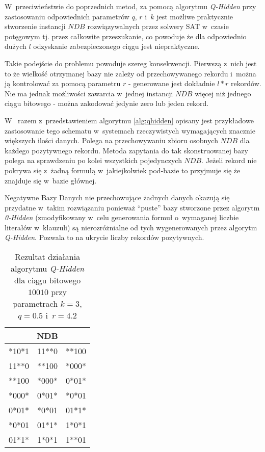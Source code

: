 W~przeciwieństwie do poprzednich metod, za pomocą algorytmu \textit{Q-Hidden} przy zastosowaniu odpowiednich
parametrów $q$, $r$ i~$k$ jest możliwe praktycznie stworzenie instancji $NDB$ rozwiązywalnych przez solwery SAT 
w~czasie potęgowym tj. przez całkowite przeszukanie, co powoduje że dla odpowiednio dużych $l$ odzyskanie 
zabezpieczonego ciągu jest niepraktyczne.

Takie podejście do problemu powoduje szereg konsekwencji. Pierwszą z~nich jest to że wielkość otrzymanej bazy
nie zależy od przechowywanego rekordu i~można ją kontrolować za pomocą parametru $r$ 
- generowane jest dokładnie $l * r$ rekordów. Nie ma jednak możliwości zawarcia w~jednej instancji $NDB$ 
więcej niż jednego ciągu bitowego - można zakodować jedynie zero lub jeden rekord.

W~\cite{HARD-NDB} razem z~przedstawieniem algorytmu \ref{alg:qhidden} opisany jest przykładowe zastosowanie tego schematu 
w~systemach rzeczywistych wymagających znacznie większych ilości danych. Polega na przechowywaniu zbioru osobnych $NDB$ 
dla każdego pozytywnego rekordu. Metoda zapytania do tak skonstruowanej bazy polega na sprawdzeniu po kolei wszystkich pojedynczych $NDB$.
Jeżeli rekord nie pokrywa się z~żadną formułą w~jakiejkolwiek pod-bazie to przyjmuje się że znajduje się w~bazie głównej.

Negatywne Bazy Danych nie przechowujące żadnych danych okazują się przydatne w~takim rozwiązaniu ponieważ \enquote{puste} bazy stworzone
przez algorytm \textit{0-Hidden} (zmodyfikowany w~celu generowania formuł o~wymaganej liczbie literałów w~klauzuli) są nierozróżnialne
od tych wygenerowanych przez algorytm \textit{Q-Hidden}. Pozwala to na ukrycie liczby rekordów pozytywnych.

\begin{table}[!tb]
    \centering
    \begin{tabular}{|lll|}
        \hline
        \multicolumn{3}{|c|}{NDB} \\ \hline
        *10*1 & 11**0 & **100 \\
        11**0 & **100 & *000* \\
        **100 & *000* & 0*01* \\
        *000* & 0*01* & *0*01 \\
        0*01* & *0*01 & 01*1* \\
        *0*01 & 01*1* & 1*0*1 \\
        01*1* & 1*0*1 & 1**01 \\
        \hline
    \end{tabular}
    \caption{Rezultat działania algorytmu \textit{Q-Hidden} dla ciągu bitowego $10010$ przy parametrach $k=3$, $q=0.5$ i~$r=4.2$}
    \label{tbl:qhidden_results}
\end{table}


